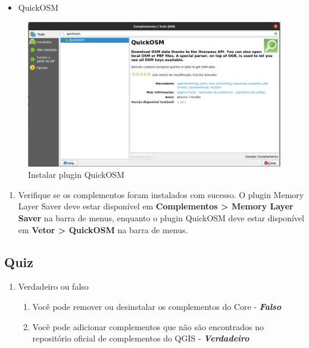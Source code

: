\documentclass[
]{krantz}
\providecommand{\tightlist}{%
  \setlength{\itemsep}{0pt}\setlength{\parskip}{0pt}}
\begin{document}
\begin{itemize}
\tightlist
\item
  QuickOSM
\end{itemize}

\begin{figure}
\centering
\includegraphics{media/modulo1/quickosm-plugin.png}
\caption{Instalar plugin QuickOSM}
\end{figure}

\begin{enumerate}
\def\labelenumi{\arabic{enumi}.}
\setcounter{enumi}{2}
\tightlist
\item
  Verifique se os complementos foram instalados com sucesso. O plugin Memory Layer Saver deve estar disponível em \textbf{Complementos \textgreater{} Memory Layer Saver} na barra de menus, enquanto o plugin QuickOSM deve estar disponível em \textbf{Vetor \textgreater{} QuickOSM} na barra de menus.
\end{enumerate}

\hypertarget{quiz-4}{%
\subsection{Quiz}\label{quiz-4}}

\begin{enumerate}
\def\labelenumi{\arabic{enumi}.}
\tightlist
\item
  Verdadeiro ou falso

  \begin{enumerate}
  \def\labelenumii{\arabic{enumii}.}
  \tightlist
  \item
    Você pode remover ou desinstalar os complementos do Core - \textbf{\emph{Falso}}
  \item
    Você pode adicionar complementos que não são encontrados no repositório oficial de complementos do QGIS - \textbf{\emph{Verdadeiro}}
  \end{enumerate}
\end{enumerate}
\end{document}
